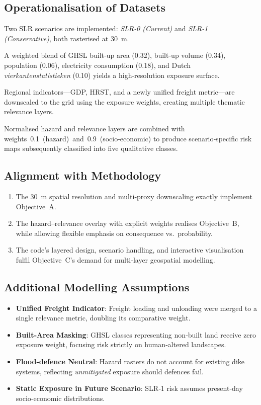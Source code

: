\documentclass[a4paper,11pt]{article}
\begin{document}
\subsection{Operationalisation of Datasets}
\begin{description}[leftmargin=*]
  \item[Hazard] Two SLR scenarios are implemented: \emph{SLR‑0 (Current)} and \emph{SLR‑1 (Conservative)}, both rasterised at \SI{30}{m}.
  \item[Exposure] A weighted blend of GHSL built‑up area (0.32), built‑up volume (0.34), population (0.06), electricity consumption (0.18), and Dutch \emph{vierkantenstatistieken} (0.10) yields a high‑resolution exposure surface.
  \item[Relevance] Regional indicators—GDP, HRST, and a newly unified freight metric—are downscaled to the grid using the exposure weights, creating multiple thematic relevance layers.
  \item[Risk] Normalised hazard and relevance layers are combined with weights 0.1 (hazard) and 0.9 (socio‑economic) to produce scenario‑specific risk maps subsequently classified into five qualitative classes.
\end{description}

\subsection{Alignment with Methodology}
\begin{enumerate}[leftmargin=*]
  \item The \SI{30}{m} spatial resolution and multi‑proxy downscaling exactly implement Objective A.
  \item The hazard–relevance overlay with explicit weights realises Objective B, while allowing flexible emphasis on consequence vs.~probability.
  \item The code’s layered design, scenario handling, and interactive visualisation fulfil Objective C’s demand for multi‑layer geospatial modelling.
\end{enumerate}

\subsection{Additional Modelling Assumptions}
\begin{itemize}[leftmargin=*]
  \item \textbf{Unified Freight Indicator}: Freight loading and unloading were merged to a single relevance metric, doubling its comparative weight.
  \item \textbf{Built‑Area Masking}: GHSL classes representing non‑built land receive zero exposure weight, focusing risk strictly on human‑altered landscapes.
  \item \textbf{Flood‑defence Neutral}: Hazard rasters do not account for existing dike systems, reflecting \emph{unmitigated} exposure should defences fail.
  \item \textbf{Static Exposure in Future Scenario}: SLR‑1 risk assumes present‑day socio‑economic distributions.
\end{itemize}
\end{document}

